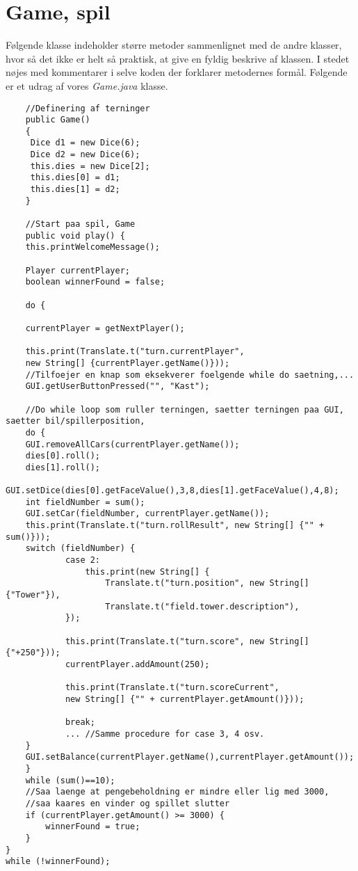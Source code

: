 \section{Game, spil}
\noindent Følgende klasse indeholder større metoder sammenlignet med de andre klasser, hvor så det ikke er helt så praktisk, at give en fyldig beskrive af klassen.
I stedet nøjes med kommentarer i selve koden der forklarer metodernes formål.
Følgende er et udrag af vores \textit{Game.java} klasse.\\
\begin{lstlisting}
    //Definering af terninger
    public Game()
    {
     Dice d1 = new Dice(6);
     Dice d2 = new Dice(6);
     this.dies = new Dice[2];
     this.dies[0] = d1;
     this.dies[1] = d2;
    }

    //Start paa spil, Game
    public void play() {
    this.printWelcomeMessage();

    Player currentPlayer;
    boolean winnerFound = false;

    do {

    currentPlayer = getNextPlayer();

    this.print(Translate.t("turn.currentPlayer",
    new String[] {currentPlayer.getName()}));
    //Tilfoejer en knap som eksekverer foelgende while do saetning,...
    GUI.getUserButtonPressed("", "Kast");
    
    //Do while loop som ruller terningen, saetter terningen paa GUI, saetter bil/spillerposition, 
    do {
    GUI.removeAllCars(currentPlayer.getName());
    dies[0].roll();
    dies[1].roll();
    GUI.setDice(dies[0].getFaceValue(),3,8,dies[1].getFaceValue(),4,8);
    int fieldNumber = sum();
    GUI.setCar(fieldNumber, currentPlayer.getName());
    this.print(Translate.t("turn.rollResult", new String[] {"" + sum()}));
    switch (fieldNumber) {
            case 2:
                this.print(new String[] {
                    Translate.t("turn.position", new String[] {"Tower"}),
                    Translate.t("field.tower.description"),
            });
            
            this.print(Translate.t("turn.score", new String[] {"+250"}));
            currentPlayer.addAmount(250);
            
            this.print(Translate.t("turn.scoreCurrent",
            new String[] {"" + currentPlayer.getAmount()}));

            break;
            ... //Samme procedure for case 3, 4 osv.
    }
    GUI.setBalance(currentPlayer.getName(),currentPlayer.getAmount());
    }
    while (sum()==10);
    //Saa laenge at pengebeholdning er mindre eller lig med 3000,
    //saa kaares en vinder og spillet slutter
    if (currentPlayer.getAmount() >= 3000) {
        winnerFound = true;
    }
}
while (!winnerFound);


\end{lstlisting}
